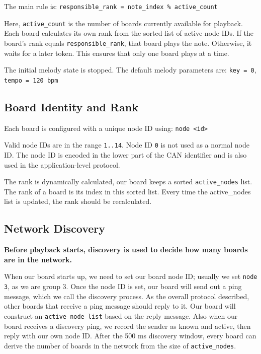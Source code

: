 \documentclass[11pt,a4paper]{article}
\begin{document}
The main rule is: \texttt{responsible\_\allowbreak{}rank = note\_\allowbreak{}index \% active\_\allowbreak{}count}

Here, \texttt{active\_\allowbreak{}count} is the number of boards currently available for playback. Each board calculates its own rank from the sorted list of active node IDs. If the board's rank equals \texttt{responsible\_\allowbreak{}rank}, that board plays the note. Otherwise, it waits for a later token. This ensures that only one board plays at a time.

The initial melody state is stopped. The default melody parameters are: \texttt{key = 0}, \texttt{tempo = 120 bpm}

\subsection*{Board Identity and Rank}

Each board is configured with a unique node ID using: \texttt{node \textless{}id\textgreater{}}

Valid node IDs are in the range \texttt{1..14}. Node ID \texttt{0} is not used as a normal node ID. The node ID is encoded in the lower part of the CAN identifier and is also used in the application-level protocol.

The rank is dynamically calculated, our board keeps a sorted \texttt{active\_\allowbreak{}nodes} list. The rank of a board is its index in this sorted list. Every time the active\_nodes list is updated, the rank should be recalculated.

\subsection*{Network Discovery}

\textbf{Before playback starts, discovery is used to decide how many boards are in the network.}

When our board starts up, we need to set our board node ID; usually we set \texttt{node 3}, as we are group 3. Once the node ID is set, our board will send out a ping message, which we call the discovery process. As the overall protocol described, other boards that receive a ping message should reply to it. Our board will construct an \texttt{active node list} based on the reply message. Also when our board receives a discovery ping, we record the sender as known and active, then reply with our own node ID. After the 500 ms discovery window, every board can derive the number of boards in the network from the size of \texttt{active\_\allowbreak{}nodes}.
\end{document}

